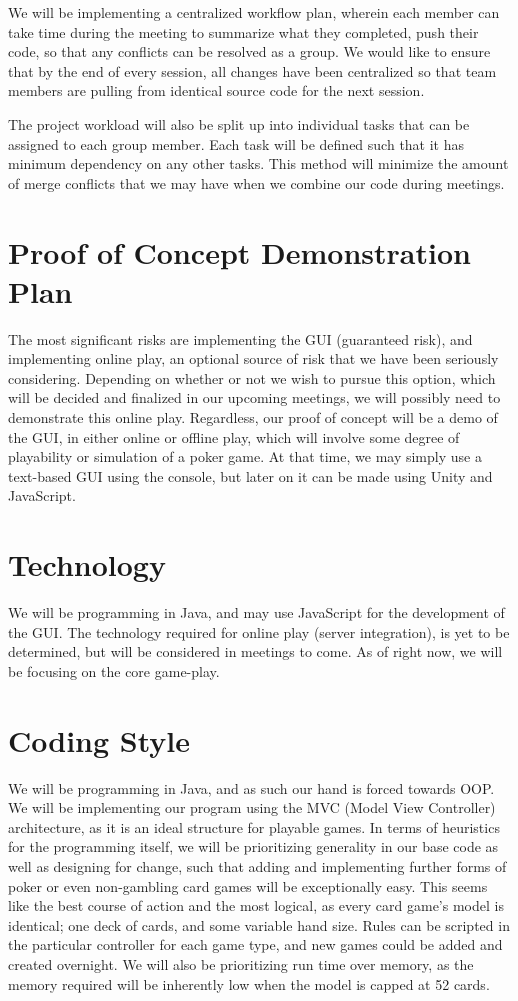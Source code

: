 \documentclass{article}
\begin{document}
We will be implementing a centralized workflow plan, wherein each member can take time during the meeting to summarize what they completed, push their code, so that any conflicts can be resolved as a group. We would like to ensure that by the end of every session, all changes have been centralized so that team members are pulling from identical source code for the next session.

The project workload will also be split up into individual tasks that can be assigned to each group member. Each task will be defined such that it has minimum dependency on any other tasks. This method will minimize the amount of merge conflicts that we may have when we combine our code during meetings. 

\section{Proof of Concept Demonstration Plan}

The most significant risks are implementing the GUI (guaranteed risk), and implementing online play, an optional source of risk that we have been seriously considering. Depending on whether or not we wish to pursue this option, which will be decided and finalized in our upcoming meetings, we will possibly need to demonstrate this online play. Regardless, our proof of concept will be a demo of the GUI, in either online or offline play, which will involve some degree of playability or simulation of a poker game. At that time, we may simply use a text-based GUI using the console, but later on it can be made using Unity and JavaScript. 


\section{Technology}

We will be programming in Java, and may use JavaScript for the development of the GUI. The technology required for online play (server integration), is yet to be determined, but will be considered in meetings to come. As of right now, we will be focusing on the core game-play. 


\section{Coding Style}

We will be programming in Java, and as such our hand is forced towards OOP. We will be implementing our program using the MVC (Model View Controller) architecture, as it is an ideal structure for playable games. In terms of heuristics for the programming itself, we will be prioritizing generality in our base code as well as designing for change, such that adding and implementing further forms of poker or even non-gambling card games will be exceptionally easy. This seems like the best course of action and the most logical, as every card game's model is identical; one deck of cards, and some variable hand size. Rules can be scripted in the particular controller for each game type, and new games could be added and created overnight. We will also be prioritizing run time over memory, as the memory required will be inherently low when the model is capped at 52 cards. 
\end{document}
